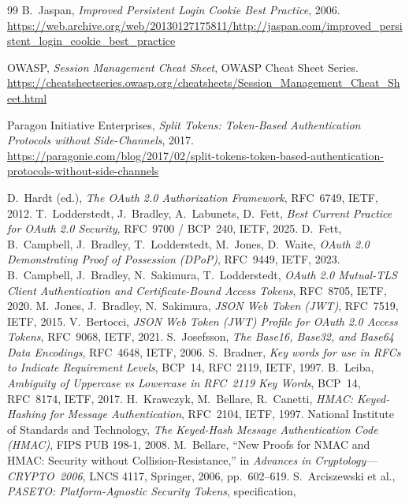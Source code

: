 \documentclass[11pt]{article}
\begin{document}
\begin{thebibliography}{99}\small
{} B.~Jaspan, \emph{Improved Persistent Login Cookie Best
  Practice}, 2006. \url{https://web.archive.org/web/20130127175811/http://jaspan.com/improved_persistent_login_cookie_best_practice}

 OWASP, \emph{Session Management Cheat Sheet}, OWASP
  Cheat Sheet Series. \url{https://cheatsheetseries.owasp.org/cheatsheets/Session_Management_Cheat_Sheet.html}

 Paragon Initiative Enterprises, \emph{Split Tokens:
  Token-Based Authentication Protocols without Side-Channels}, 2017.
  \url{https://paragonie.com/blog/2017/02/split-tokens-token-based-authentication-protocols-without-side-channels}

 D.~Hardt (ed.), \emph{The OAuth 2.0 Authorization
Framework}, RFC~6749, IETF, 2012.
 T.~Lodderstedt, J.~Bradley, A.~Labunets, D.~Fett,
\emph{Best Current Practice for OAuth 2.0 Security}, RFC~9700 / BCP~240,
IETF, 2025.
 D.~Fett, B.~Campbell, J.~Bradley, T.~Lodderstedt,
M.~Jones, D.~Waite, \emph{OAuth 2.0 Demonstrating Proof of Possession
(DPoP)}, RFC~9449, IETF, 2023.
 B.~Campbell, J.~Bradley, N.~Sakimura, T.~Lodderstedt,
\emph{OAuth 2.0 Mutual-TLS Client Authentication and Certificate-Bound
Access Tokens}, RFC~8705, IETF, 2020.
 M.~Jones, J.~Bradley, N.~Sakimura, \emph{JSON Web Token
(JWT)}, RFC~7519, IETF, 2015.
 V.~Bertocci, \emph{JSON Web Token (JWT) Profile for OAuth
2.0 Access Tokens}, RFC~9068, IETF, 2021.
 S.~Josefsson, \emph{The Base16, Base32, and Base64 Data
Encodings}, RFC~4648, IETF, 2006.
 S.~Bradner, \emph{Key words for use in RFCs to Indicate
Requirement Levels}, BCP~14, RFC~2119, IETF, 1997.
 B.~Leiba, \emph{Ambiguity of Uppercase vs Lowercase in
RFC~2119 Key Words}, BCP~14, RFC~8174, IETF, 2017.
 H.~Krawczyk, M.~Bellare, R.~Canetti, \emph{HMAC:
Keyed-Hashing for Message Authentication}, RFC~2104, IETF, 1997.
 National Institute of Standards and Technology, \emph{The
Keyed-Hash Message Authentication Code (HMAC)}, FIPS PUB 198-1, 2008.
 M.~Bellare, ``New Proofs for NMAC and HMAC: Security
without Collision-Resistance,'' in \emph{Advances in
Cryptology---CRYPTO~2006}, LNCS 4117, Springer, 2006, pp.~602--619.
 S.~Arciszewski et al., \emph{PASETO: Platform-Agnostic
Security Tokens}, specification,

\end{thebibliography}
\end{document}
